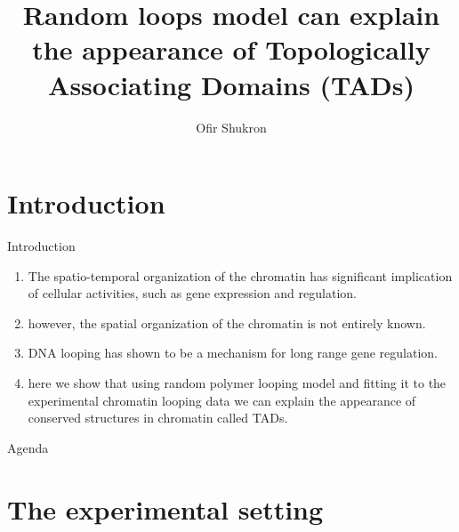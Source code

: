 \documentclass[8pt]{beamer}
\title{Random loops model can explain the appearance of Topologically Associating Domains (TADs)}
\author{Ofir Shukron}
\begin{document}
\begin{frame} %
\titlepage
\end{frame}

\section{Introduction}\label{section_introduction}
\begin{frame}{Introduction}
\begin{enumerate}
\item The spatio-temporal organization of the chromatin has significant implication of  cellular activities, such as gene expression and regulation. 
\item however, the spatial organization of the chromatin is not entirely known.
\item DNA looping has shown to be a mechanism for long range gene regulation.
\item here we show that using  random polymer looping model and fitting it to the  experimental chromatin looping data we can explain the appearance of conserved structures in chromatin called TADs.
\end{enumerate}
\end{frame}


\begin{frame}{Agenda}
\tableofcontents
\end{frame}


\section{The experimental setting}\label{section_theExperimentalSetting}
\end{document}
